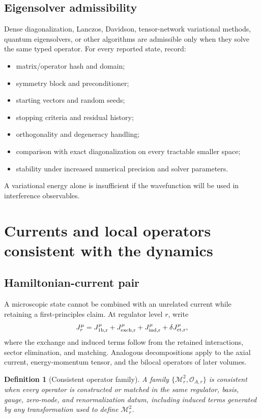 \documentclass[11pt]{article}
\newtheorem{definition}{Definition}[section]
\newcommand{\cO}{\mathcal O}
\newcommand{\cM}{\mathcal M}
\begin{document}
\subsection{Eigensolver admissibility}

Dense diagonalization, Lanczos, Davidson, tensor-network variational methods,
quantum eigensolvers, or other algorithms are admissible only when they solve
the same typed operator.  For every reported state, record:
\begin{itemize}
\item matrix/operator hash and domain;
\item symmetry block and preconditioner;
\item starting vectors and random seeds;
\item stopping criteria and residual history;
\item orthogonality and degeneracy handling;
\item comparison with exact diagonalization on every tractable smaller
space;
\item stability under increased numerical precision and solver parameters.
\end{itemize}
A variational energy alone is insufficient if the wavefunction will be used
in interference observables.

\section{Currents and local operators consistent with the dynamics}
\label{sec:currents}

\subsection{Hamiltonian-current pair}

A microscopic state cannot be combined with an unrelated current while
retaining a first-principles claim.  At regulator level \(r\), write
\begin{equation}
 J_r^\mu
 =J_{1\rm b,r}^\mu
 +J_{\rm exch,r}^\mu
 +J_{\rm ind,r}^\mu
 +\delta J_{\rm ct,r}^\mu,
\label{eq:current-decomposition}
\end{equation}
where the exchange and induced terms follow from the retained interactions,
sector elimination, and matching.  Analogous decompositions apply to the
axial current, energy-momentum tensor, and the bilocal operators of later
volumes.

\begin{definition}[Consistent operator family]
\label{def:consistent-operator-family}
A family \(\{\cM_r^2,\cO_{A,r}\}\) is consistent when every operator is
constructed or matched in the same regulator, basis, gauge, zero-mode, and
renormalization datum, including induced terms generated by any
transformation used to define \(\cM_r^2\).
\end{definition}
\end{document}
